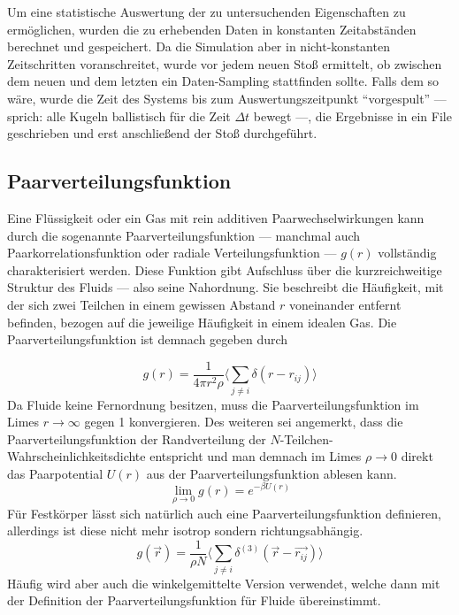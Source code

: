 Um eine statistische Auswertung der zu untersuchenden Eigenschaften zu ermöglichen, wurden die zu erhebenden Daten in konstanten Zeitabständen berechnet und gespeichert. Da die Simulation aber in nicht-konstanten Zeitschritten voranschreitet, wurde vor jedem neuen Stoß ermittelt, ob zwischen dem neuen und dem letzten ein Daten-Sampling stattfinden sollte. Falls dem so wäre, wurde die Zeit des Systems bis zum Auswertungszeitpunkt ``vorgespult'' --- sprich: alle Kugeln ballistisch für die Zeit $\Delta t$ bewegt ---, die Ergebnisse in ein File geschrieben und erst anschließend der Stoß durchgeführt.   
\subsection{Paarverteilungsfunktion}\label{sec:paarverteilung}
Eine Flüssigkeit oder ein Gas mit rein additiven Paarwechselwirkungen kann durch die sogenannte Paarverteilungsfunktion --- manchmal auch Paarkorrelationsfunktion oder radiale Verteilungsfunktion --- $g(r)$ vollständig charakterisiert werden. Diese Funktion gibt Aufschluss über die kurzreichweitige Struktur des Fluids --- also seine Nahordnung. Sie beschreibt die Häufigkeit, mit der sich zwei Teilchen in einem gewissen Abstand $r$ voneinander entfernt befinden, bezogen auf die jeweilige Häufigkeit in einem idealen Gas. Die Paarverteilungsfunktion ist demnach gegeben durch
 
 \begin{equation}
g(r) = \frac{1}{4\pi r^2 \rho}\langle \sum_{j\neq i} \delta(r-r_{ij}) \rangle
\end{equation}
Da Fluide keine Fernordnung besitzen, muss die Paarverteilungsfunktion im Limes $r \rightarrow \infty$ gegen 1 konvergieren. Des weiteren sei angemerkt, dass die Paarverteilungsfunktion der Randverteilung der $N$-Teilchen-Wahrscheinlichkeitsdichte entspricht und man demnach im Limes $\rho \rightarrow 0$ direkt das Paarpotential $U(r)$ aus der Paarverteilungsfunktion ablesen kann.  
\begin{equation}
\lim_{\rho \rightarrow 0} g(r) = e^{-\beta U(r)}
\end{equation}
Für Festkörper lässt sich natürlich auch eine Paarverteilungsfunktion definieren, allerdings ist diese nicht mehr isotrop sondern richtungsabhängig. 
\begin{equation}
g(\vec{r}) = \frac{1}{\rho N} \langle \sum_{j\neq i} \delta^{(3)}(\vec{r}-\vec{r_{ij}}) \rangle
\end{equation} 
Häufig wird aber auch die winkelgemittelte Version verwendet, welche dann mit der Definition der Paarverteilungsfunktion für Fluide übereinstimmt. 

